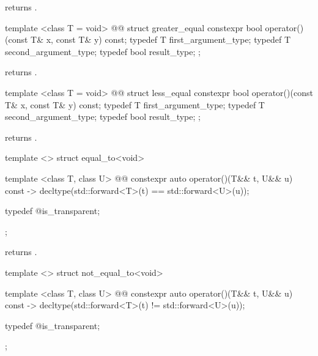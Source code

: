 \begin{itemdescr}
\pnum
{} returns .
\end{itemdescr}

%
\begin{itemdecl}
template <class T = void>
  @@
struct greater_equal {
  constexpr bool operator()(const T& x, const T& y) const;
  typedef T first_argument_type;
  typedef T second_argument_type;
  typedef bool result_type;
};
\end{itemdecl}

\begin{itemdescr}
\pnum
{} returns .
\end{itemdescr}

%
\begin{itemdecl}
template <class T = void>
  @@
struct less_equal {
  constexpr bool operator()(const T& x, const T& y) const;
  typedef T first_argument_type;
  typedef T second_argument_type;
  typedef bool result_type;
};
\end{itemdecl}

\begin{itemdescr}
\pnum
{} returns .
\end{itemdescr}

%
\begin{itemdecl}
template <> struct equal_to<void> {
  template <class T, class U>
    @@
  constexpr auto operator()(T&& t, U&& u) const
    -> decltype(std::forward<T>(t) == std::forward<U>(u));

  typedef @\unspec@ is_transparent;
};
\end{itemdecl}

\begin{itemdescr}
\pnum
{} returns .
\end{itemdescr}

%
\begin{itemdecl}
template <> struct not_equal_to<void> {
  template <class T, class U>
    @@
  constexpr auto operator()(T&& t, U&& u) const
    -> decltype(std::forward<T>(t) != std::forward<U>(u));

  typedef @\unspec@ is_transparent;
};
\end{itemdecl}

